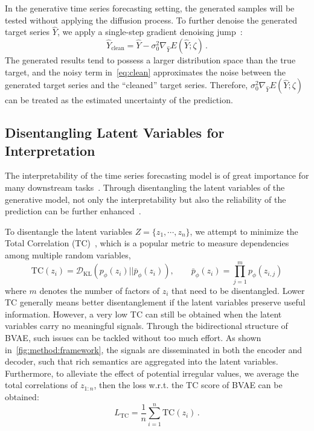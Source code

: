 In the generative time series forecasting setting, the generated samples will be tested without applying the diffusion process. 
To further denoise the generated target series $\widehat{Y}$, we apply a single-step gradient denoising jump~\cite{saremi2019neural}:
\begin{equation}	    \label{eq:clean}
    \widehat{Y}_{\text{clean}} = \widehat{Y} - \sigma_0^2 \nabla_{\widehat{Y}} E (\widehat{Y}; \zeta) \, .
\end{equation}
The generated results tend to possess a larger distribution space than the true target,  and the noisy term in~\cref{eq:clean} approximates the noise between the generated target series and the ``cleaned'' target series.
Therefore,  $\sigma_0^2 \nabla_{\widehat{Y}} E (\widehat{Y}; \zeta)$  can be treated as the estimated uncertainty of the prediction.

\subsection{Disentangling Latent Variables for Interpretation}     \label{sec:disentangle}

The interpretability of the time series forecasting model is of great importance for many downstream tasks~\cite{tonekaboni2020went, hardt2020explaining, ismail2020benchmarking}.
Through disentangling the latent variables of the generative model, not only the interpretability but also the reliability of the prediction can be further enhanced~\cite{li2021learning}.

To disentangle the latent variables $ Z = \{ z_1, \cdots, z_n \} $, we attempt to minimize the Total Correlation (TC)~\cite{watanabe1960information, kim2018disentangling}, which is a popular metric to measure  dependencies among multiple random variables, %
\begin{equation}
    \text{TC}(z_i) = \mathcal{D}_{\mathrm{KL}} (p_\phi (z_i) || \bar{p}_{\phi} (z_i)), 
    \qquad 
    \bar{p}_\phi (z_i) = \prod_{j=1}^{m} p_\phi (z_{i,j})
\end{equation}
where $m$ denotes the number of factors of $z_i$ that need to be disentangled. 
Lower TC generally means better disentanglement if the latent variables preserve useful information.
However, a very low TC can still be obtained when the latent variables carry no meaningful signals. 
Through the bidirectional structure of BVAE, such issues can be tackled without too much effort.
As shown in~\cref{fig:method:framework}, the signals are disseminated in both the encoder and decoder, such that rich semantics are aggregated into the latent variables. 
Furthermore, to alleviate the effect of potential irregular values, we average the total correlations of $z_{1:n}$, 
then the loss w.r.t. the TC  score of BVAE can be obtained:  
\begin{equation}	    \label{tc}
    L_{\text{TC}} = \frac{1}{n}\sum_{i=1}^{n}\text{TC}(z_i) \, .
\end{equation}

